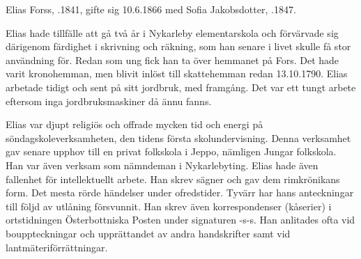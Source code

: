Elias Forss, .1841, gifte sig 10.6.1866 med Sofia Jakobsdotter, .1847.
\begin{jhchildren}
  \item {}
  \item {}
  \item {}
  \item {}
  \item {}
  \item {}
  \item {}
  \item {}
  \item {}
  \item {}
\end{jhchildren}

Elias hade tillfälle att gå två år i Nykarleby elementarskola och förvärvade sig därigenom färdighet i skrivning och räkning, som han senare i livet skulle få stor användning för. Redan som ung fick han ta över hemmanet på Fors. Det hade varit kronohemman, men blivit inlöst till skattehemman redan 13.10.1790. Elias arbetade tidigt och sent på sitt jordbruk, med framgång. Det var ett tungt arbete eftersom inga jordbruksmaskiner då ännu fanns.

Elias var djupt religiös och offrade mycken tid och energi på söndagskoleverksamheten, den tidens första skolundervisning. Denna verksamhet gav senare upphov till en privat folkskola i Jeppo, nämligen Jungar folkskola. Han var även verksam som nämndeman i Nykarlebyting. Elias hade även fallenhet för intellektuellt arbete. Han skrev sägner och gav dem rimkrönikans form. Det mesta rörde händelser under ofredstider. Tyvärr har hans anteckningar till följd av utlåning försvunnit. Han skrev även korrespondenser (kåserier) i ortstidningen Österbottniska Posten under signaturen -s-s. Han anlitades ofta vid bouppteckningar och upprättandet av andra handskrifter samt vid lantmäteriförrättningar.

